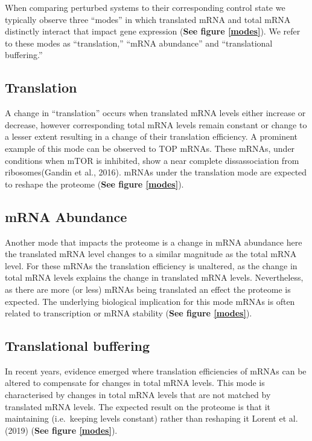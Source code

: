 \documentclass[
  12pt,
  openany]{book}
\begin{document}
When comparing perturbed systems to their corresponding control state we typically observe three ``modes'' in which translated mRNA and total mRNA distinctly interact that impact gene expression (\textbf{See figure \ref{modes}}). We refer to these modes as ``translation,'' ``mRNA abundance'' and ``translational buffering.''

\subsection{Translation}

A change in ``translation'' occurs when translated mRNA levels either increase or decrease, however corresponding total mRNA levels remain constant or change to a lesser extent resulting in a change of their translation efficiency. A prominent example of this mode can be observed to TOP mRNAs. These mRNAs, under conditions when mTOR is inhibited, show a near complete dissassociation from ribosomes(Gandin et al., 2016). mRNAs under the translation mode are expected to reshape the proteome (\textbf{See figure \ref{modes}}).

\subsection{mRNA Abundance}

Another mode that impacts the proteome is a change in mRNA abundance here the translated mRNA level changes to a similar magnitude as the total mRNA level. For these mRNAs the translation efficiency is unaltered, as the change in total mRNA levels explains the change in translated mRNA levels. Nevertheless, as there are more (or less) mRNAs being translated an effect the proteome is expected. The underlying biological implication for this mode mRNAs is often related to transcription or mRNA stability (\textbf{See figure \ref{modes}}).

\subsection{Translational buffering} \label{modeBuffering}

In recent years, evidence emerged where translation efficiencies of mRNAs can be altered to compensate for changes in total mRNA levels. This mode is characterised by changes in total mRNA levels that are not matched by translated mRNA levels. The expected result on the proteome is that it maintaining (i.e.~keeping levels constant) rather than reshaping it Lorent et al. (2019) (\textbf{See figure \ref{modes}}).
\end{document}
